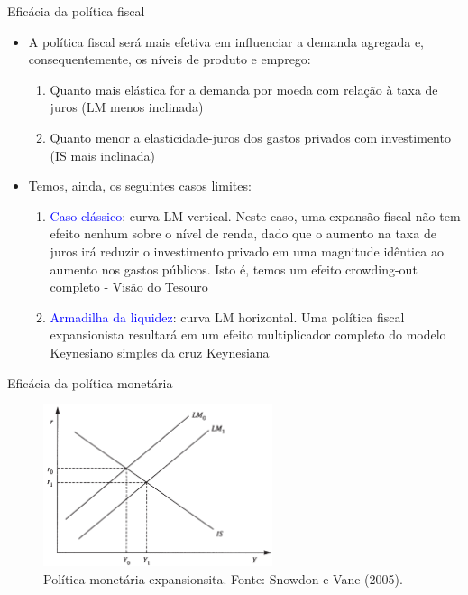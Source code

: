 \documentclass[10pt]{beamer}
\begin{document}
\begin{frame}{Eficácia da política fiscal}
    \begin{itemize}
        \item A política fiscal será mais efetiva em influenciar a demanda agregada e, consequentemente, os níveis de produto e emprego:
        \bigskip
        \begin{enumerate}
            \item Quanto mais elástica for a demanda por moeda com relação à taxa de juros (LM menos inclinada)
            \medskip
            \item Quanto menor a elasticidade-juros dos gastos privados com investimento (IS mais inclinada)
        \end{enumerate}
        \bigskip
        \item Temos, ainda, os seguintes casos limites:
        \bigskip
        \begin{enumerate}
            \item \textcolor{blue}{Caso clássico}: curva LM vertical. Neste caso, uma expansão fiscal não tem efeito nenhum sobre o nível de renda, dado que o aumento na taxa de juros irá reduzir o investimento privado em uma magnitude idêntica ao aumento nos gastos públicos. Isto é, temos um efeito crowding-out completo - Visão do Tesouro
            \medskip
            \item \textcolor{blue}{Armadilha da liquidez}: curva LM horizontal. Uma política fiscal expansionista resultará em um efeito multiplicador completo do modelo Keynesiano simples da cruz Keynesiana
        \end{enumerate}
    \end{itemize}
\end{frame}

\begin{frame}{Eficácia da política monetária}
    \begin{figure}
        \centering
        \includegraphics[width=0.6\textwidth]{./figures/aula06_fig4.PNG}
        \caption{Política monetária expansionsita. Fonte: Snowdon e Vane (2005).}
        \label{fig4}
    \end{figure}
\end{frame}
\end{document}
